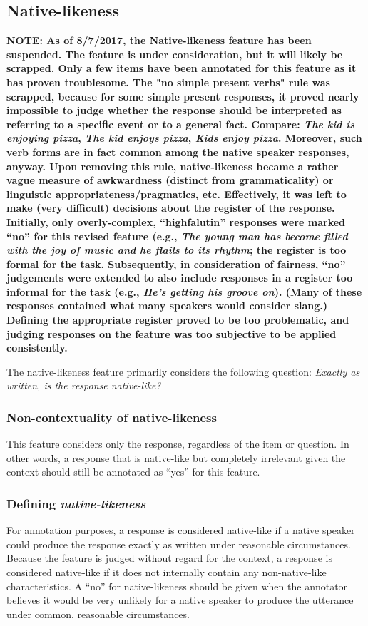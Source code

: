 \documentclass[12pt,notitlepage]{article}
\begin{document}
\subsection{Native-likeness} \label{subsec:native-likeness}
\textbf{NOTE: As of 8/7/2017, the Native-likeness feature has been suspended. The feature is under consideration, but it will likely be scrapped. Only a few items have been annotated for this feature as it has proven troublesome. The "no simple present verbs" rule was scrapped, because for some simple present responses, it proved nearly impossible to judge whether the response should be interpreted as referring to a specific event or to a general fact. Compare: \textit{The kid is enjoying pizza}, \textit{The kid enjoys pizza}, \textit{Kids enjoy pizza}. Moreover, such verb forms are in fact common among the native speaker responses, anyway. Upon removing this rule, native-likeness became a rather vague measure of awkwardness (distinct from grammaticality) or linguistic appropriateness/pragmatics, etc. Effectively, it was left to make (very difficult) decisions about the register of the response. Initially, only overly-complex, ``highfalutin'' responses were marked ``no'' for this revised feature (e.g., \textit{The young man has become filled with the joy of music and he flails to its rhythm}; the register is too formal for the task. Subsequently, in consideration of fairness, ``no'' judgements were extended to also include responses in a register too informal for the task (e.g., \textit{He's getting his groove on}). (Many of these responses contained what many speakers would consider slang.) Defining the appropriate register proved to be too problematic, and judging responses on the feature was too subjective to be applied consistently.}

The native-likeness feature primarily considers the following question: \textit{Exactly as written, is the response native-like?} 

\subsubsection{Non-contextuality of native-likeness} This feature considers only the response, regardless of the item or question. In other words, a response that is native-like but completely irrelevant given the context should still be annotated as ``yes'' for this feature. 

\subsubsection{Defining \textit{native-likeness}} 
For annotation purposes, a response is considered native-like if a native speaker could produce the response exactly as written under reasonable circumstances. Because the feature is judged without regard for the context, a response is considered native-like if it does not internally contain any non-native-like characteristics. A ``no'' for native-likeness should be given when the annotator believes it would be very unlikely for a native speaker to produce the utterance under common, reasonable circumstances.
\end{document}
